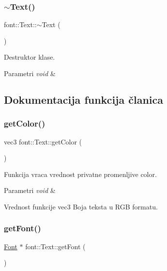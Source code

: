 \subsubsection{\texorpdfstring{$\sim$\+Text()}{~Text()}}
{\footnotesize\ttfamily font\+::\+Text\+::$\sim$\+Text (\begin{DoxyParamCaption}{ }\end{DoxyParamCaption})}



Destruktor klase. 


\begin{DoxyParams}{Parametri}
{\em void} & \\
\hline
\end{DoxyParams}


\subsection{Dokumentacija funkcija članica}
\mbox{\label{classfont_1_1Text_ae947a015d868f5750e28b10010b0cb9d}} 
\subsubsection{\texorpdfstring{get\+Color()}{getColor()}}
{\footnotesize\ttfamily vec3 font\+::\+Text\+::get\+Color (\begin{DoxyParamCaption}{ }\end{DoxyParamCaption})}



Funkcija vraca vrednost privatne promenljive color. 


\begin{DoxyParams}{Parametri}
{\em void} & \\
\hline
\end{DoxyParams}
\begin{DoxyReturn}{Vrednost funkcije}
vec3 Boja teksta u R\+GB formatu. 
\end{DoxyReturn}
\mbox{\label{classfont_1_1Text_a8ef804f199ccc299a180ad82e588fa38}} 
\subsubsection{\texorpdfstring{get\+Font()}{getFont()}}
{\footnotesize\ttfamily \hyperlink{classfont_1_1Font}{Font} $\ast$ font\+::\+Text\+::get\+Font (\begin{DoxyParamCaption}{ }\end{DoxyParamCaption})}



